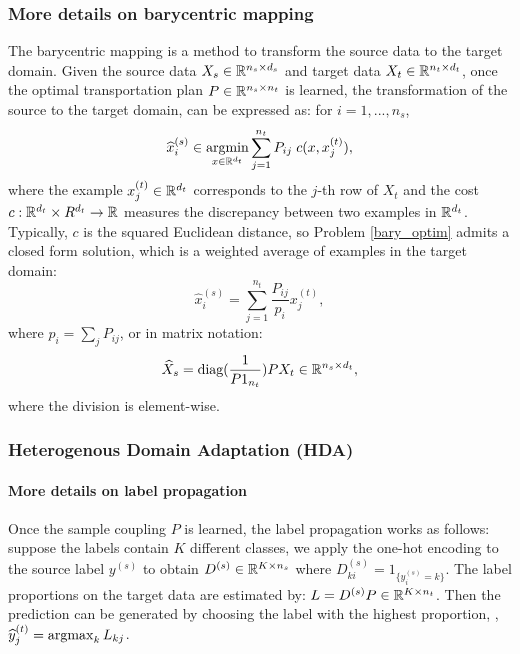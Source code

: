 \subsubsection{More details on barycentric mapping}  \label{bary_mapping}

The barycentric mapping \citep{Ferradans14,Courty16} is a method to transform the source data
to the target domain. Given the source data $X_s \in \mathbb R^{n_s \times d_s}$ and
target data $X_t \in \mathbb R^{n_t \times d_t}$, once the optimal transportation plan
$P \in \mathbb R^{n_s \times n_t}$ is learned, the transformation of the source to the target domain,
can be expressed as: for $i = 1, ..., n_s$,
\begin{equation} \label{bary_optim}
    \widehat{x}_i^{(s)} \in \operatorname*{argmin}_{x \in \mathbb R^{d_t}}
    \sum_{j = 1}^{n_t} P_{ij} \; c(x, x_j^{(t)}),
\end{equation}
where the example $x^{(t)}_j \in \mathbb R^{d_t}$ corresponds to the $j$-th row of $X_t$ and
the cost $c: \mathbb R^{d_t} \times R^{d_t} \to \mathbb R$ measures the discrepancy between
two examples in $\mathbb R^{d_t}$. Typically, $c$ is the squared Euclidean distance,
so Problem \eqref{bary_optim} admits a closed form solution, which is a weighted average of
examples in the target domain:
\begin{equation}
    \widehat{x}_i^{(s)} = \sum_{j = 1}^{n_t} \frac{P_{ij}}{p_i} x_j^{(t)},
\end{equation}
where $p_i = \sum_{j} P_{ij}$, or in matrix notation:
\begin{equation} \label{transOT:1}
    \widehat{X}_s= \text{diag}(\frac{1}{P 1_{n_t}}) P X_t \in \mathbb R^{n_s \times d_t},
\end{equation}
where the division is element-wise.

\subsubsection{Heterogenous Domain Adaptation (HDA)}
\paragraph{More details on label propagation}

Once the sample coupling $P$ is learned, the label propagation works as follows:
suppose the labels contain $K$ different classes,
we apply the one-hot encoding to the source label $y^{(s)}$ to obtain
$D^{(s)} \in \mathbb R^{K \times n_s}$ where $D^{(s)}_{ki} = 1_{\{y^{(s)}_i = k\}}$.
The label proportions on the target data are
estimated by: $L = D^{(s)} P \in \mathbb R^{K \times n_t}$. Then the prediction can be generated
by choosing the label with the highest proportion, \ie, $\widehat{y}^{(t)}_j = \operatorname*{argmax}_k L_{kj}$.

